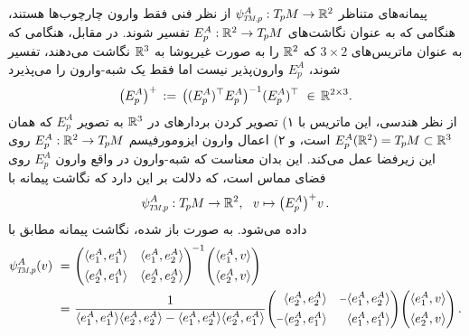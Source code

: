 پیمانه‌های متناظر $\psiTMp^A: \TpM \to \R^2$ از نظر فنی فقط وارون چارچوب‌ها هستند، هنگامی که به عنوان نگاشت‌های $E^A_p: \mathbb{R}^2 \to T_{\mkern-1.5mu p}\mkern-.5muM$ تفسیر شوند.
در مقابل، هنگامی که به عنوان ماتریس‌های $3\times 2$ که $\mathbb{R}^2$ را به صورت غیرپوشا به $\mathbb{R}^3$ نگاشت می‌دهند، تفسیر شوند، $E^A_p$ وارون‌پذیر نیست اما فقط یک شبه-وارون را می‌پذیرد
\begin{align}
    \big(E^A_p \big)^+ \,:=\, \big( (E^A_p)^\top E^A_p \big)^{-1} (E^A_p)^\top \ \in\, \mathbb{R}^{2\times 3} .
\end{align}
از نظر هندسی، این ماتریس با
۱) تصویر کردن بردارهای در $\mathbb{R}^3$ به تصویر $E_p^A$ که همان $E_p^A(\mathbb{R}^2) = T_{\mkern-1.5mu p}\mkern-.5muM \subset \mathbb{R}^3$ است، و
۲) اعمال وارون ایزومورفیسم $E_p^A: \mathbb{R}^2 \to T_{\mkern-1.5mu p}\mkern-.5muM$ روی این زیرفضا عمل می‌کند.
این بدان معناست که شبه-وارون در واقع وارون $E_p^A$ روی فضای مماس است، که دلالت بر این دارد که نگاشت پیمانه با
\begin{align}
    \psiTMp^A: \TpM \to \R^2, \ \ v \mapsto \big(E_p^A \big)^+ v \,.
\end{align}
داده می‌شود. به صورت باز شده، نگاشت پیمانه مطابق با
\begin{align}
    \psiTMp^A(v)\ =&\ 
    \Bigg( \mkern-9mu
    \begin{array}{cc}
        \langle e_1^A, e_1^A \rangle   & \langle e_1^A, e_2^A \rangle \\[4pt]
        \langle e_2^A, e_1^A \rangle   & \langle e_2^A, e_2^A \rangle
    \end{array}
    \mkern-9mu \Bigg)^{\!-1}
    \Bigg( \mkern-9mu
    \begin{array}{cc}
        \langle e_1^A, v \rangle \\[4pt]
        \langle e_2^A, v \rangle
    \end{array}
    \mkern-9mu \Bigg)
    \notag \\
    \ =&\ 
    \frac{1}{
          \langle e_1^A, e_1^A \rangle \langle e_2^A, e_2^A \rangle
        - \langle e_1^A, e_2^A \rangle \langle e_2^A, e_1^A \rangle
    }
    \Bigg( \mkern-9mu
    \begin{array}{cc}
        \phantom{\minus}\langle e_2^A, e_2^A \rangle   &         \minus \langle e_1^A, e_2^A \rangle \\[4pt]
                 \minus \langle e_2^A, e_1^A \rangle   & \phantom{\minus}\langle e_1^A, e_1^A \rangle
    \end{array}
    \mkern-9mu \Bigg)
    \Bigg( \mkern-9mu
    \begin{array}{cc}
        \langle e_1^A, v \rangle \\[4pt]
        \langle e_2^A, v \rangle
    \end{array}
    \mkern-9mu \Bigg) \,.
\end{align}
